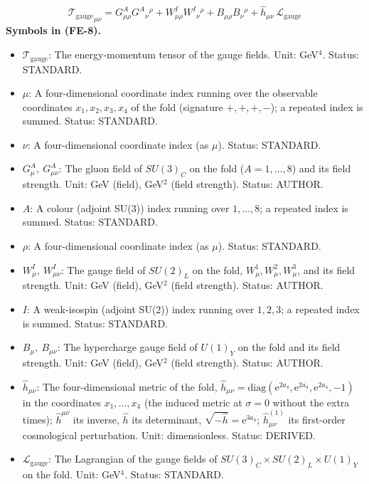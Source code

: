 \documentclass[
  10pt,
]{article}
\providecommand{\tightlist}{%
  \setlength{\itemsep}{0pt}\setlength{\parskip}{0pt}}
\begin{document}
\[
{\mathcal{T}_{\mathrm{gauge}}}_{\mu\nu} = G^A_{\mu\rho}G^A{}_\nu{}^\rho + W^I_{\mu\rho}W^I{}_\nu{}^\rho + B_{\mu\rho}B_\nu{}^\rho
 + \hat h_{\mu\nu}\,\mathcal{L}_{\mathrm{gauge}} \tag{FE-8}
\] \textbf{Symbols in (FE-8).}

\begin{itemize}
\tightlist
\item
  \(\mathcal{T}_{\mathrm{gauge}}\): The energy-momentum tensor of the
  gauge fields. Unit: GeV\(^4\). Status: STANDARD.
\item
  \(\mu\): A four-dimensional coordinate index running over the
  observable coordinates \(x_1, x_2, x_3, x_4\) of the fold (signature
  \(+,+,+,-\)); a repeated index is summed. Status: STANDARD.
\item
  \(\nu\): A four-dimensional coordinate index (as \(\mu\)). Status:
  STANDARD.
\item
  \(G^A_\mu,\ G^A_{\mu\nu}\): The gluon field of \(SU(3)_C\) on the fold
  (\(A = 1, \dots, 8\)) and its field strength. Unit: GeV (field),
  GeV\(^2\) (field strength). Status: AUTHOR.
\item
  \(A\): A colour (adjoint SU(3)) index running over \(1, \dots, 8\); a
  repeated index is summed. Status: STANDARD.
\item
  \(\rho\): A four-dimensional coordinate index (as \(\mu\)). Status:
  STANDARD.
\item
  \(W^I_\mu,\ W^I_{\mu\nu}\): The gauge field of \(SU(2)_L\) on the
  fold, \(W^1_\mu, W^2_\mu, W^3_\mu\), and its field strength. Unit: GeV
  (field), GeV\(^2\) (field strength). Status: AUTHOR.
\item
  \(I\): A weak-isospin (adjoint SU(2)) index running over \(1, 2, 3\);
  a repeated index is summed. Status: STANDARD.
\item
  \(B_\mu,\ B_{\mu\nu}\): The hypercharge gauge field of \(U(1)_Y\) on
  the fold and its field strength. Unit: GeV (field), GeV\(^2\) (field
  strength). Status: AUTHOR.
\item
  \(\hat h_{\mu\nu}\): The four-dimensional metric of the fold,
  \(\hat h_{\mu\nu} = \mathrm{diag}(\mathrm{e}^{2a_4}, \mathrm{e}^{2a_4}, \mathrm{e}^{2a_4}, -1)\)
  in the coordinates \(x_1, \dots, x_4\) (the induced metric at
  \(\sigma = 0\) without the extra times); \(\hat h^{\mu\nu}\) its
  inverse, \(\hat h\) its determinant,
  \(\sqrt{-\hat h} = \mathrm{e}^{3a_4}\); \(\hat h^{(1)}_{\mu\nu}\) its
  first-order cosmological perturbation. Unit: dimensionless. Status:
  DERIVED.
\item
  \(\mathcal{L}_{\mathrm{gauge}}\): The Lagrangian of the gauge fields
  of \(SU(3)_C\times SU(2)_L\times U(1)_Y\) on the fold. Unit:
  GeV\(^4\). Status: STANDARD.
\end{itemize}
\end{document}
